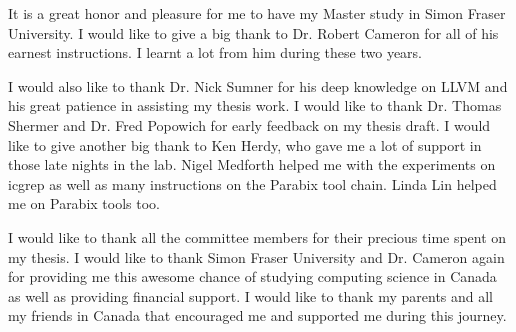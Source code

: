
%
%


It is a great honor and pleasure for me to have my Master study in Simon Fraser University. I would like to give a big thank to Dr. Robert Cameron for all of his earnest instructions. I learnt a lot from him during these two years.

I would also like to thank Dr. Nick Sumner for his deep knowledge on LLVM and his great patience in assisting my thesis work. I would like to thank Dr. Thomas Shermer and Dr. Fred Popowich for early feedback on my thesis draft. I would like to give another big thank to Ken Herdy, who gave me a lot of support in those late nights in the lab. Nigel Medforth helped me with the experiments on icgrep as well as many instructions on the Parabix tool chain. Linda Lin helped me on Parabix tools too.

I would like to thank all the committee members for their precious time spent on my thesis. I would like to thank Simon Fraser University and Dr. Cameron again for providing me this awesome chance of studying computing science in Canada as well as providing financial support. I would like to thank my parents and all my friends in Canada that encouraged me and supported me during this journey.












